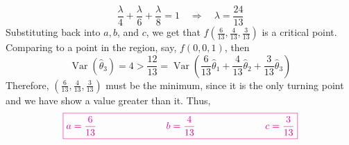 \documentclass[12pt]{article}
\newcommand*{\Var}[1]{\operatorname{Var}(#1)}
\begin{document}
\begin{enumerate}
\begin{enumerate}
\begin{mybox}
            $$\frac{\lambda}{4} + \frac{\lambda}{6} + \frac{\lambda}{8} = 1 \quad \Longrightarrow \quad \lambda = \frac{24}{13}$$
        Substituting back into $a, b$, and $c$, we get that $f(\frac{6}{13}, \frac{4}{13}, \frac{3}{13})$ is a critical point. Comparing to a point in the region, say, $f(0,0,1)$, then\\$$\Var{\hat{\theta}_3} = 4 > \frac{12}{13} = \Var{\frac{6}{13}\hat{\theta}_1 + \frac{4}{13}\hat{\theta}_2 + \frac{3}{13}\hat{\theta}_3}$$
        Therefore, $(\frac{6}{13}, \frac{4}{13}, \frac{3}{13})$ must be the minimum, since it is the only turning point and we have show a value greater than it. Thus,
        $${\color{magenta} \boxed{ a = \frac{6}{13} \hspace{1in} b = \frac{4}{13} \hspace{1in} c = \frac{3}{13} }}$$
        \end{mybox}
        
        
        
    \end{enumerate}
\end{enumerate}
\end{document}
